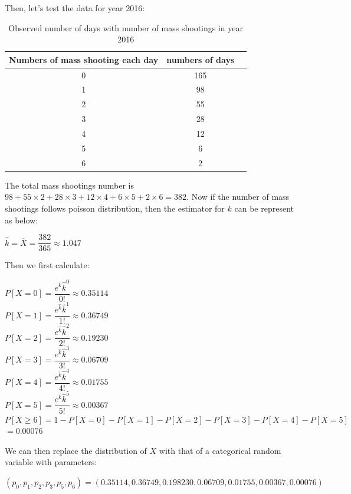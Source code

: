 \documentclass[12pt]{article}
\begin{document}
\par Then, let's test the data for year 2016:
\begin{table} [H]
\begin{center}
\begin{tabular*} {14cm} {@{\extracolsep{\fill} }ccc}
\toprule
Numbers of mass shooting each day & numbers of days \\
\midrule
0 & 165 \\ \hline
1 & 98 \\ \hline
2 & 55\\ \hline
3 & 28 \\ \hline
4 & 12  \\ \hline
5 & 6  \\ \hline
6 & 2  \\
\bottomrule
\end{tabular*}
\end{center}
\caption{Observed number of days with number of mass shootings in year 2016}
\end{table}
\par The total mass shootings number is $98+55\times2+28\times3+12\times4+6\times5+2\times6=382$. Now if the number of mass shootings follows poisson distribution, then the estimator for $k$ can be represent as below:
\begin{center}
$\hat k=\overline X=\dfrac{382}{365} \approx1.047$
\end{center}
\par Then we first calculate:
\begin{center}
$P[X=0]=\dfrac{e^{\hat k}\hat k^0}{0!} \approx0.35114$\\
$P[X=1]=\dfrac{e^{\hat k}\hat k^1}{1!} \approx0.36749$\\
$P[X=2]=\dfrac{e^{\hat k}\hat k^2}{2!} \approx0.19230$\\
$P[X=3]=\dfrac{e^{\hat k}\hat k^3}{3!} \approx0.06709$\\
$P[X=4]=\dfrac{e^{\hat k}\hat k^4}{4!} \approx0.01755$\\
$P[X=5]=\dfrac{e^{\hat k}\hat k^5}{5!} \approx0.00367$\\
$P[X\geq6]=1-P[X=0]-P[X=1]-P[X=2]-P[X=3]-P[X=4]-P[X=5]$\\
$=0.00076$
\end{center}
\par We can then replace the distribution of $X$ with that of a categorical random variable with parameters:
\begin{center}
$(p_0,p_1,p_2,p_3,p_5,p_6)=(0.35114,0.36749,0.198230,0.06709,0.01755,0.00367,0.00076)$
\end{center}
\end{document}
